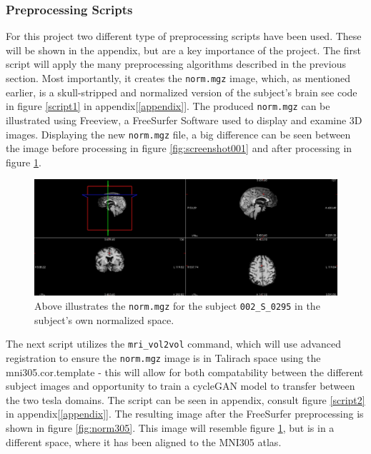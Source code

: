 \documentclass[12pt, fleqn, titlepage]{article}
\newcommand{\1}[1]{\mathds{1}\left[#1\right]}
\begin{document}
\subsubsection{Preprocessing Scripts}\label{preprocess_scripts}
For this project two different type of preprocessing scripts have been used. These will be shown in the appendix, but are a key importance of the project. The first script will apply the many preprocessing algorithms described in the previous section. Most importantly, it creates the \texttt{norm.mgz} image, which, as mentioned earlier, is a skull-stripped and normalized version of the subject's brain see code in figure \ref{script1} in appendix[\ref{appendix}].
The produced \texttt{norm.mgz} can be illustrated using Freeview, a FreeSurfer Software used to display and examine 3D images. 
Displaying the new \texttt{norm.mgz} file, a big difference can be seen between the image before processing in figure \ref{fig:screenshot001} and after processing in figure \ref{fig:norm}.

\begin{figure}[H]
	\centering
	\includegraphics[width=0.9\linewidth]{imgs/norm}
	\caption{Above illustrates the \texttt{norm.mgz} for the subject \texttt{002\_S\_0295} in the subject's own normalized space.} 
	\label{fig:norm}
\end{figure}

The next script utilizes the \texttt{mri\_vol2vol} command, which will use advanced registration to ensure the \texttt{norm.mgz} image is in Talirach space using the mni305.cor.template - this will allow for both compatability between the different subject images and opportunity to train a cycleGAN model to transfer between the two tesla domains. The script can be seen in appendix, consult figure \ref{script2} in appendix[\ref{appendix}].
\noindent
The resulting image after the FreeSurfer preprocessing is shown in figure \ref{fig:norm305}. This image will resemble figure \ref{fig:norm}, but is in a different space, where it has been aligned to the MNI305 atlas. 
\end{document}
